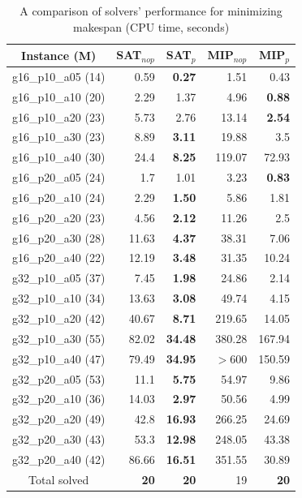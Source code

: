 \documentclass[conference]{IEEEtran}
\begin{document}
\begin{table}[t]
\caption{\label{tab:res}A comparison of solvers' performance for minimizing makespan (CPU time, seconds)}
\centering
\begin{tabular}{|c|r|r|r|r|}  \cline{1-5}
Instance (M) & SAT$_{nop}$ & SAT$_p$ & MIP$_{nop}$ & MIP$_p$  \\ \hline \hline
g16\_p10\_a05 (14)  & 0.59 &   {\bf 0.27}  & 1.51 & 0.43  \\ \hline
g16\_p10\_a10 (20)  & 2.29 & 1.37 & 4.96 &   {\bf 0.88}   \\ \hline
g16\_p10\_a20 (23)  & 5.73 & 2.76 & 13.14 &   {\bf 2.54}   \\ \hline
g16\_p10\_a30 (23)  & 8.89 &   {\bf 3.11}  & 19.88 & 3.5  \\ \hline
g16\_p10\_a40 (30)  & 24.4 &   {\bf 8.25}  & 119.07 & 72.93  \\ \hline
g16\_p20\_a05 (24)  & 1.7 & 1.01 & 3.23 &   {\bf 0.83}   \\ \hline
g16\_p20\_a10 (24)  & 2.29 &   {\bf 1.50}  & 5.86 & 1.81  \\ \hline
g16\_p20\_a20 (23)  & 4.56 &   {\bf 2.12}  & 11.26 & 2.5  \\ \hline
g16\_p20\_a30 (28)  & 11.63 &   {\bf 4.37}  & 38.31 & 7.06  \\ \hline
g16\_p20\_a40 (22)  & 12.19 &   {\bf 3.48}  & 31.35 & 10.24  \\ \hline
g32\_p10\_a05 (37)  & 7.45 &   {\bf 1.98}  & 24.86 & 2.14  \\ \hline
g32\_p10\_a10 (34)  & 13.63 &   {\bf 3.08}  & 49.74 & 4.15  \\ \hline
g32\_p10\_a20 (42)  & 40.67 &   {\bf 8.71}  & 219.65 & 14.05  \\ \hline
g32\_p10\_a30 (55)  & 82.02 &  {\bf 34.48}  & 380.28 & 167.94  \\ \hline
g32\_p10\_a40 (47)  & 79.49 &  {\bf 34.95}  &  $>$600  & 150.59  \\ \hline
g32\_p20\_a05 (53)  & 11.1 &   {\bf 5.75}  & 54.97 & 9.86  \\ \hline
g32\_p20\_a10 (36)  & 14.03 &   {\bf 2.97}  & 50.56 & 4.99  \\ \hline
g32\_p20\_a20 (49)  & 42.8 &  {\bf 16.93}  & 266.25 & 24.69  \\ \hline
g32\_p20\_a30 (43)  & 53.3 &  {\bf 12.98}  & 248.05 & 43.38  \\ \hline
g32\_p20\_a40 (42)  & 86.66 &  {\bf 16.51}  & 351.55 & 30.89  \\ \hline \hline
Total solved  &  {\bf 20}  &  {\bf 20}  & 19 &  {\bf 20} \\ \hline
\end{tabular}
\end{table}
\end{document}

